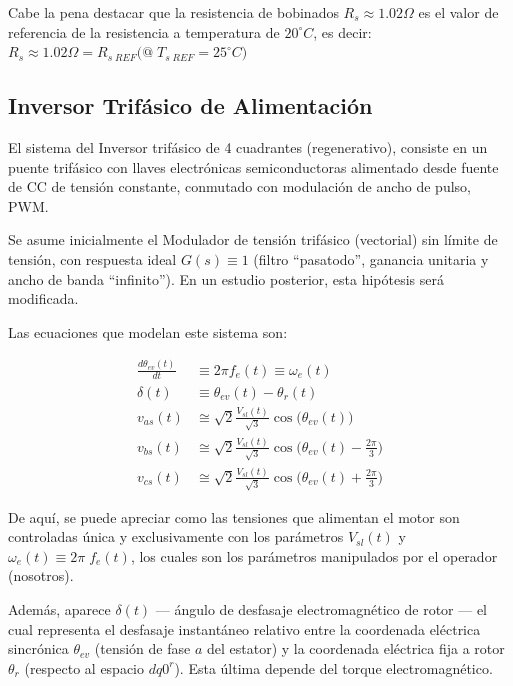 \documentclass[blue,fullpaper]{ludusofficial}  %
\begin{document}
Cabe la pena destacar que la resistencia de bobinados $R_s \approx 1.02 \Omega$ es el valor de referencia de la resistencia a temperatura de $20^{\circ}C$, es decir: $R_s \approx 1.02 \Omega = R_{s \; REF} \Big( @ \; T_{s \; REF}=25^\circ C \Big)$

\subsection{Inversor Trifásico de Alimentación}
El sistema del Inversor trifásico de 4 cuadrantes (regenerativo), consiste en un puente trifásico con llaves electrónicas semiconductoras  alimentado desde fuente de CC de tensión constante, conmutado con modulación de ancho de pulso, PWM.

Se asume inicialmente el Modulador de tensión trifásico (vectorial) sin límite de tensión, con respuesta ideal $G(s) \equiv 1$ (filtro “pasatodo”, ganancia unitaria y ancho de banda “infinito”). En un estudio posterior, esta hipótesis será modificada.

Las ecuaciones que modelan este sistema son:

\begin{align}
    \frac{d\theta_{ev}(t)}{dt}  & \equiv 2\pi f_{e}(t) \equiv \omega_{e}(t)
\label{eq:angulo-inversor} \\
    \delta(t)  & \equiv \theta_{ev}(t) - \theta_{r}(t)
\label{eq:desfase-inversor} \\
    v_{as}(t)  & \cong \sqrt{ 2 } \frac{V_{sl}(t)}{\sqrt{ 3 }} \cos \Big( \theta_{ev}(t) \Big)
\label{eq:tension-fase-a} \\
    v_{bs}(t) &  \cong \sqrt{ 2 } \frac{V_{sl}(t)}{\sqrt{ 3 }} \cos \Big( \theta_{ev}(t) - \frac{2\pi}{3} \Big)
\label{eq:tension-fase-b} \\
    v_{cs}(t) &  \cong \sqrt{ 2 } \frac{V_{sl}(t)}{\sqrt{ 3 }} \cos \Big( \theta_{ev}(t) + \frac{2\pi}{3}  \Big)
\label{eq:tension-fase-c}
\end{align}

De aquí, se puede apreciar como las tensiones que alimentan el motor son controladas única y exclusivamente con los parámetros $V_{sl}(t)$ y $\omega_e(t)\equiv 2\pi \; f_e(t)$, los cuales son los parámetros manipulados por el operador (nosotros).

Además, aparece $\delta(t)$ — ángulo de desfasaje electromagnético de rotor — el cual representa el desfasaje instantáneo relativo entre la coordenada eléctrica sincrónica $\theta_{ev}$ (tensión de fase $a$ del estator) y la coordenada eléctrica fija a rotor $\theta_r$ (respecto al espacio $dq0^r$). Esta última depende del torque electromagnético.
\end{document}
